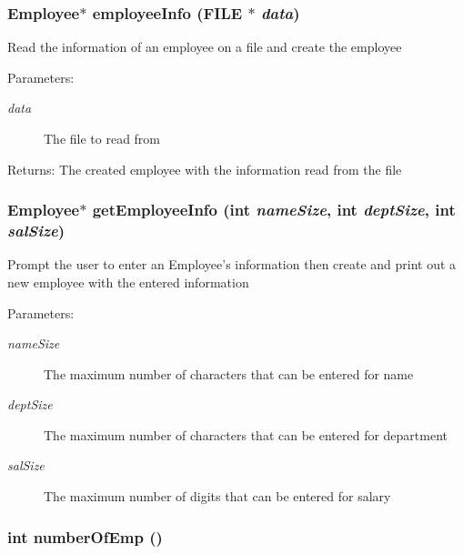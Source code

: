 \subsubsection{\setlength{\rightskip}{0pt plus 5cm}\bf{Employee}$\ast$ employee\-Info (FILE $\ast$ {\em data})}\label{struct_8h_d1dec782f287f497cd0aa38952408134}


Read the information of an employee on a file and create the employee \begin{Desc}
\item[Parameters:]
\begin{description}
\item[{\em data}]The file to read from \end{description}
\end{Desc}
\begin{Desc}
\item[Returns:]The created employee with the information read from the file \end{Desc}
\subsubsection{\setlength{\rightskip}{0pt plus 5cm}\bf{Employee}$\ast$ get\-Employee\-Info (int {\em name\-Size}, int {\em dept\-Size}, int {\em sal\-Size})}\label{struct_8h_88c3438b462401d8f0849705bb085823}


Prompt the user to enter an Employee's information then create and print out a new employee with the entered information \begin{Desc}
\item[Parameters:]
\begin{description}
\item[{\em name\-Size}]The maximum number of characters that can be entered for name \item[{\em dept\-Size}]The maximum number of characters that can be entered for department \item[{\em sal\-Size}]The maximum number of digits that can be entered for salary \end{description}
\end{Desc}
\subsubsection{\setlength{\rightskip}{0pt plus 5cm}int number\-Of\-Emp ()}\label{struct_8h_d780e2a0cc7c9df2861e5f5fd1742fa9}


